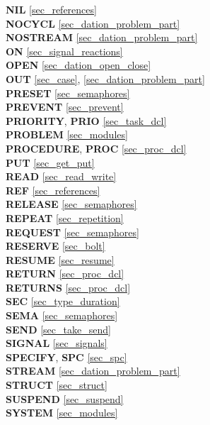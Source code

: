 {{\bf NIL} \ref{sec_references}\\
{\bf NOCYCL} \ref{sec_dation_problem_part}\\
{\bf NOSTREAM} \ref{sec_dation_problem_part}\\

{\bf ON} \ref{sec_signal_reactions}\\
{\bf OPEN} \ref{sec_dation_open_close}\\
{\bf OUT} \ref{sec_case}, \ref{sec_dation_problem_part}\\
 
{\bf PRESET} \ref{sec_semaphores}\\
{\bf PREVENT} \ref{sec_prevent}\\
{\bf PRIORITY}, {\bf PRIO} \ref{sec_task_dcl}\\
{\bf PROBLEM} \ref{sec_modules}\\
{\bf PROCEDURE}, {\bf PROC} \ref{sec_proc_dcl}\\
{\bf PUT} \ref{sec_get_put}\\

{\bf READ} \ref{sec_read_write}\\
{\bf REF} \ref{sec_references}\\
{\bf RELEASE} \ref{sec_semaphores}\\
{\bf REPEAT} \ref{sec_repetition}\\
{\bf REQUEST} \ref{sec_semaphores}\\
{\bf RESERVE} \ref{sec_bolt}\\
{\bf RESUME} \ref{sec_resume}\\
{\bf RETURN} \ref{sec_proc_dcl}\\
{\bf RETURNS} \ref{sec_proc_dcl}\\
 
{\bf SEC} \ref{sec_type_duration}\\
{\bf SEMA} \ref{sec_semaphores}\\
{\bf SEND} \ref{sec_take_send}\\
{\bf SIGNAL} \ref{sec_signals}\\
{\bf SPECIFY}, {\bf SPC} \ref{sec_spc}\\
{\bf STREAM} \ref{sec_dation_problem_part}\\
{\bf STRUCT} \ref{sec_struct}\\
{\bf SUSPEND} \ref{sec_suspend}\\
{\bf SYSTEM} \ref{sec_modules}\\
 
}
